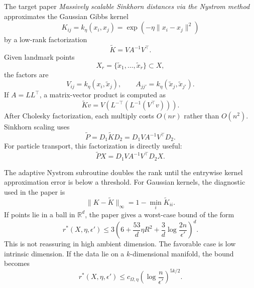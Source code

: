 \documentclass[11pt]{article}
\newcommand{\R}{\mathbb{R}}
\begin{document}
The target paper \emph{Massively scalable Sinkhorn distances via the Nystrom
method} approximates the Gaussian Gibbs kernel \citep{altschuler2019nystrom}
\begin{equation}
K_{ij}
=
k_\eta(x_i,x_j)
=
\exp(-\eta\|x_i-x_j\|^2)
\label{eq:nystrom-kernel}
\end{equation}
by a low-rank factorization
\begin{equation}
\tilde K = V A^{-1}V^\top.
\label{eq:nystrom-factorization}
\end{equation}
Given landmark points
\begin{equation}
X_r=\{\tilde x_1,\ldots,\tilde x_r\}\subset X,
\label{eq:nystrom-landmarks}
\end{equation}
the factors are
\begin{equation}
V_{ij}=k_\eta(x_i,\tilde x_j),
\qquad
A_{jj'}=k_\eta(\tilde x_j,\tilde x_{j'}).
\label{eq:nystrom-factors}
\end{equation}
If $A=LL^\top$, a matrix-vector product is computed as
\begin{equation}
\tilde K v
=
V\left(L^{-\top}\left(L^{-1}(V^\top v)\right)\right).
\label{eq:nystrom-matvec}
\end{equation}
After Cholesky factorization, each multiply costs $O(nr)$ rather than
$O(n^2)$.  Sinkhorn scaling uses
\begin{equation}
\tilde P
=
D_1\tilde K D_2
=
D_1 V A^{-1}V^\top D_2.
\label{eq:nystrom-plan}
\end{equation}
For particle transport, this factorization is directly useful:
\begin{equation}
\tilde P X
=
D_1V A^{-1}V^\top D_2X.
\label{eq:nystrom-transport}
\end{equation}

The adaptive Nystrom subroutine doubles the rank until the entrywise kernel
approximation error is below a threshold.  For Gaussian kernels, the diagnostic
used in the paper is
\begin{equation}
\|K-\tilde K\|_\infty
=
1-\min_i\tilde K_{ii}.
\label{eq:nystrom-diag-error}
\end{equation}
If points lie in a ball in $\R^d$, the paper gives a worst-case bound of the
form
\begin{equation}
r^\ast(X,\eta,\epsilon')
\le
3\left(
6+\frac{53}{d}\eta R^2
+\frac{3}{d}\log\frac{2n}{\epsilon'}
\right)^d.
\label{eq:nystrom-ball-rank}
\end{equation}
This is not reassuring in high ambient dimension.  The favorable case is
low intrinsic dimension.  If the data lie on a $k$-dimensional manifold, the
bound becomes
\begin{equation}
r^\ast(X,\eta,\epsilon')
\le
c_{\Omega,\eta}
\left(\log\frac{n}{\epsilon'}\right)^{5k/2}.
\label{eq:nystrom-manifold-rank}
\end{equation}
\end{document}
